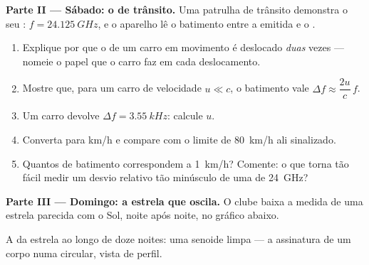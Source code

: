 \begin{problem}
\medskip
\noindent\textbf{Parte II --- Sábado: o  de trânsito.}
Uma patrulha de trânsito demonstra o seu : $f = \qty{24.125}{GHz}$,
e o aparelho lê o batimento entre a  emitida e o .
\begin{enumerate}[resume]
  \item Explique por que o  de um carro em movimento é deslocado
        \emph{duas} vezes --- nomeie o papel que o carro faz em cada
        deslocamento.
  \item Mostre que, para um carro de velocidade $u \ll c$, o batimento
        vale $\Delta f \approx \dfrac{2u}{c}\,f$.
  \item Um carro devolve $\Delta f = \qty{3.55}{kHz}$: calcule $u$.
  \item Converta para \unit{km/h} e compare com o limite de
        \qty{80}{km/h} ali sinalizado.
  \item Quantos  de batimento correspondem a \qty{1}{km/h}?
        Comente: o que torna tão fácil medir um desvio relativo tão
        minúsculo de uma  de \qty{24}{GHz}?
\end{enumerate}

\medskip
\noindent\textbf{Parte III --- Domingo: a estrela que oscila.}
O clube baixa a  medida de uma estrela parecida com o
Sol, noite após noite, no gráfico abaixo.

\begin{omfigure}

{\small A  da estrela ao longo de doze noites: uma
senoide limpa --- a assinatura de um corpo numa  circular, vista de
perfil.}
\end{omfigure}


\end{problem}

